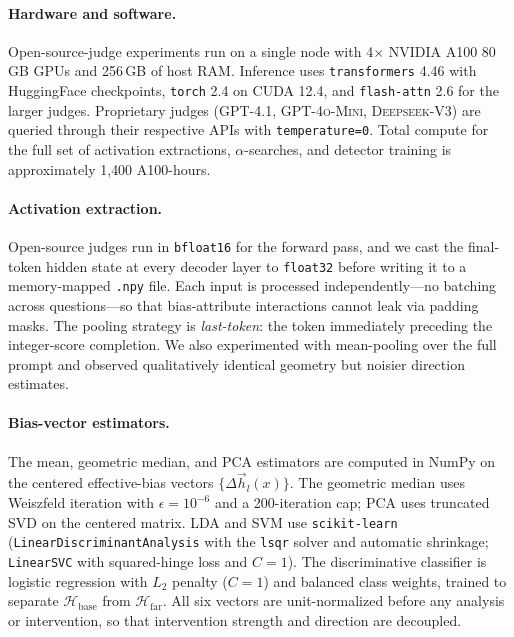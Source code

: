 \documentclass[11pt]{article}
\begin{document}
\paragraph{Hardware and software.}
Open-source-judge experiments run on a single node with 4$\times$ NVIDIA A100 80\,GB GPUs and 256\,GB of host RAM. Inference uses \texttt{transformers} 4.46 with HuggingFace checkpoints, \texttt{torch} 2.4 on CUDA 12.4, and \texttt{flash-attn} 2.6 for the larger judges. Proprietary judges (\textsc{GPT-4.1}, \textsc{GPT-4o-Mini}, \textsc{Deepseek-V3}) are queried through their respective APIs with \texttt{temperature{=}0}. Total compute for the full set of activation extractions, $\alpha$-searches, and detector training is approximately 1{,}400 A100-hours.

\paragraph{Activation extraction.}
Open-source judges run in \texttt{bfloat16} for the forward pass, and we cast the final-token hidden state at every decoder layer to \texttt{float32} before writing it to a memory-mapped \texttt{.npy} file. Each input is processed independently---no batching across questions---so that bias-attribute interactions cannot leak via padding masks. The pooling strategy is \emph{last-token}: the token immediately preceding the integer-score completion. We also experimented with mean-pooling over the full prompt and observed qualitatively identical geometry but noisier direction estimates.

\paragraph{Bias-vector estimators.}
The mean, geometric median, and PCA estimators are computed in NumPy on the centered effective-bias vectors $\{\Delta\vec{h}_l(x)\}$. The geometric median uses Weiszfeld iteration with $\epsilon{=}10^{-6}$ and a 200-iteration cap; PCA uses truncated SVD on the centered matrix. LDA and SVM use \texttt{scikit-learn} (\texttt{LinearDiscriminantAnalysis} with the \texttt{lsqr} solver and automatic shrinkage; \texttt{LinearSVC} with squared-hinge loss and $C{=}1$). The discriminative classifier is logistic regression with $L_2$ penalty ($C{=}1$) and balanced class weights, trained to separate $\mathcal{H}_{\text{base}}$ from $\mathcal{H}_{\text{far}}$. All six vectors are unit-normalized before any analysis or intervention, so that intervention strength and direction are decoupled.
\end{document}
